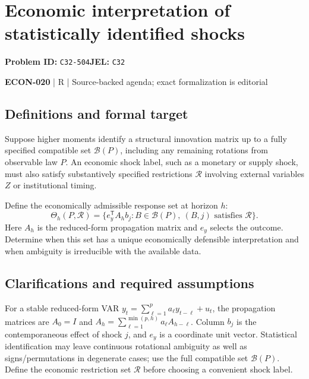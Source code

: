 \documentclass[11pt,a4paper]{article}
\begin{document}
\section*{Economic interpretation of statistically identified shocks}
\textbf{Problem ID:} \texttt{C32-504}\quad \textbf{JEL:} \texttt{C32}\par
\label{problem:OP-0604}


\label{audited:ECON-020}

{\sffamily\small\color{muted}\textbf{ECON-020} | R | Source-backed agenda; exact formalization is editorial\par}

\subsection*{Definitions and formal target}

Suppose higher moments identify a structural innovation matrix up to a fully specified compatible set $\mathcal B(P)$, including any remaining rotations from observable law $P$. An economic shock label, such as a monetary or supply shock, must also satisfy substantively specified restrictions $\mathcal R$ involving external variables $Z$ or institutional timing.

Define the economically admissible response set at horizon $h$:
\[
 \Theta_h(P,\mathcal R)=
 \{e_y^{\mathsf T}A_h b_j:B\in\mathcal B(P),\ (B,j)\text{ satisfies }\mathcal R\}.
\]
Here $A_h$ is the reduced-form propagation matrix and $e_y$ selects the outcome. Determine when this set has a unique economically defensible interpretation and when ambiguity is irreducible with the available data.

\subsection*{Clarifications and required assumptions}

For a stable reduced-form VAR $y_t=\sum_{\ell=1}^pa_\ell y_{t-\ell}+u_t$, the propagation matrices are $A_0=I$ and $A_h=\sum_{\ell=1}^{\min(p,h)}a_\ell A_{h-\ell}$. Column $b_j$ is the contemporaneous effect of shock $j$, and $e_y$ is a coordinate unit vector. Statistical identification may leave continuous rotational ambiguity as well as signs/permutations in degenerate cases; use the full compatible set $\mathcal B(P)$. Define the economic restriction set $\mathcal R$ before choosing a convenient shock label.
\end{document}
